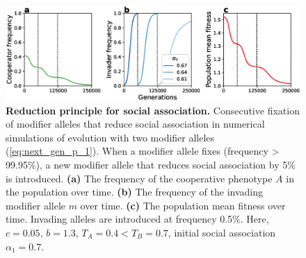 \documentclass[12pt]{extarticle}
\begin{document}
\begin{figure}[p]
  \centering
   \includegraphics[scale=0.5]{Figures/invasion.eps}
  \caption{
  \textbf{Reduction principle for social association.} 
  Consecutive fixation of modifier alleles that reduce social association in numerical simulations of evolution with two modifier alleles (\autoref{eq:next_gen_p_1}).
  When a modifier allele fixes (frequency > 99.95\%), a new modifier allele that reduces social association by 5\% is introduced. \textbf{(a)} The frequency of the cooperative phenotype $A$ in the population over time. \textbf{(b)} The frequency of the invading modifier allele $m$ over time. \textbf{(c)} The population mean fitness over time. Invading alleles are introduced at frequency 0.5\%.
  Here, $c = 0.05$, $b=1.3$, $T_A=0.4<T_B=0.7$, initial social association $\alpha_1=0.7$.  
  }
  \label{fig:invasion}
\end{figure}


  

\newpage
\end{document}
